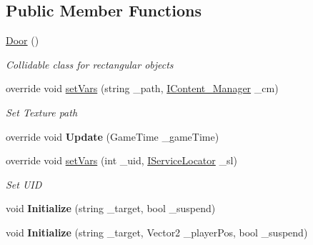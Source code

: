 \subsection*{Public Member Functions}
\begin{DoxyCompactItemize}
\item 
\mbox{\hyperlink{class_g_m_t_b_1_1_collision_system_1_1_door_ae90b24f7ad2241cc276bdc625519e70d}{Door}} ()
\begin{DoxyCompactList}\small\item\em Collidable class for rectangular objects \end{DoxyCompactList}\item 
override void \mbox{\hyperlink{class_g_m_t_b_1_1_collision_system_1_1_door_a45583194dab8dc4b35266644b94d3c40}{set\+Vars}} (string \+\_\+path, \mbox{\hyperlink{interface_g_m_t_b_1_1_interfaces_1_1_i_content___manager}{I\+Content\+\_\+\+Manager}} \+\_\+cm)
\begin{DoxyCompactList}\small\item\em Set Texture path \end{DoxyCompactList}\item 
\mbox{\label{class_g_m_t_b_1_1_collision_system_1_1_door_ad60e856d8992db43773447d965a546e4}} 
override void {\bfseries Update} (Game\+Time \+\_\+game\+Time)
\item 
override void \mbox{\hyperlink{class_g_m_t_b_1_1_collision_system_1_1_door_a31faede8cd554e4cfea2a012a1c4928e}{set\+Vars}} (int \+\_\+uid, \mbox{\hyperlink{interface_g_m_t_b_1_1_interfaces_1_1_i_service_locator}{I\+Service\+Locator}} \+\_\+sl)
\begin{DoxyCompactList}\small\item\em Set U\+ID \end{DoxyCompactList}\item 
\mbox{\label{class_g_m_t_b_1_1_collision_system_1_1_door_a9b0e9fdaa76cd067da0ac754334274f4}} 
void {\bfseries Initialize} (string \+\_\+target, bool \+\_\+suspend)
\item 
\mbox{\label{class_g_m_t_b_1_1_collision_system_1_1_door_a30aacec32b3960e65a465d3095c07820}} 
void {\bfseries Initialize} (string \+\_\+target, Vector2 \+\_\+player\+Pos, bool \+\_\+suspend)
\item 
\mbox{\label{class_g_m_t_b_1_1_collision_system_1_1_door_a4a4b1b9772f62848b318c80b6b0f8025}} 

\end{DoxyCompactItemize}
